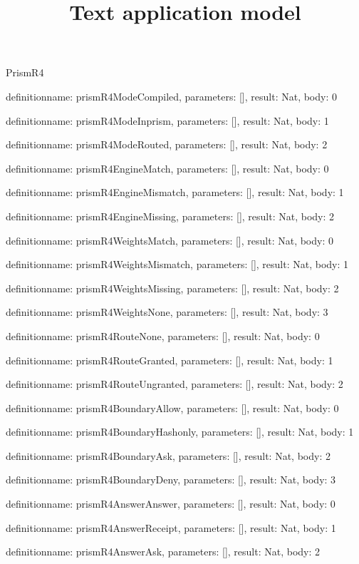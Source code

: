 \begin{lexlean}{PrismR4}
\title{Text application model}
\begin{semanticmodule}
definition{name: prismR4ModeCompiled, parameters: [], result: Nat, body: 0}

definition{name: prismR4ModeInprism, parameters: [], result: Nat, body: 1}

definition{name: prismR4ModeRouted, parameters: [], result: Nat, body: 2}

definition{name: prismR4EngineMatch, parameters: [], result: Nat, body: 0}

definition{name: prismR4EngineMismatch, parameters: [], result: Nat, body: 1}

definition{name: prismR4EngineMissing, parameters: [], result: Nat, body: 2}

definition{name: prismR4WeightsMatch, parameters: [], result: Nat, body: 0}

definition{name: prismR4WeightsMismatch, parameters: [], result: Nat, body: 1}

definition{name: prismR4WeightsMissing, parameters: [], result: Nat, body: 2}

definition{name: prismR4WeightsNone, parameters: [], result: Nat, body: 3}

definition{name: prismR4RouteNone, parameters: [], result: Nat, body: 0}

definition{name: prismR4RouteGranted, parameters: [], result: Nat, body: 1}

definition{name: prismR4RouteUngranted, parameters: [], result: Nat, body: 2}

definition{name: prismR4BoundaryAllow, parameters: [], result: Nat, body: 0}

definition{name: prismR4BoundaryHashonly, parameters: [], result: Nat, body: 1}

definition{name: prismR4BoundaryAsk, parameters: [], result: Nat, body: 2}

definition{name: prismR4BoundaryDeny, parameters: [], result: Nat, body: 3}

definition{name: prismR4AnswerAnswer, parameters: [], result: Nat, body: 0}

definition{name: prismR4AnswerReceipt, parameters: [], result: Nat, body: 1}

definition{name: prismR4AnswerAsk, parameters: [], result: Nat, body: 2}


\end{semanticmodule}
\end{lexlean}
